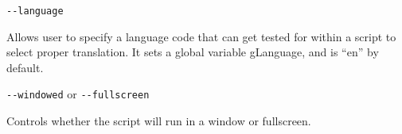 \begin{description}
  
\item
\begin{verbatim}
--language
\end{verbatim}
  Allows user to specify a language code that can get tested for
  within a script to select proper translation.  It sets a global
  variable gLanguage, and is ``en'' by default.

\item
\verb+--windowed+ or \verb+--fullscreen+

Controls whether the script will run in a window or fullscreen.  
\end{description}



